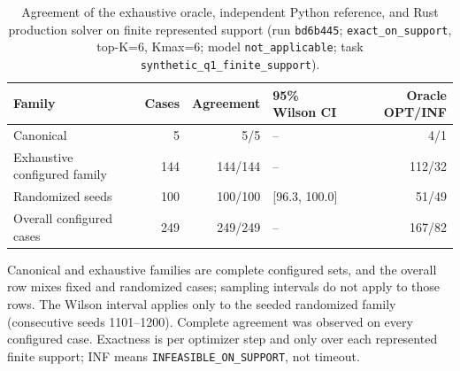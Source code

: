 \begin{table}[t]
\centering
\caption{Agreement of the exhaustive oracle, independent Python reference, and Rust production solver on finite represented support (run \texttt{bd6b445}; \texttt{exact\_on\_support}, top-K=6, Kmax=6; model \texttt{not\_applicable}; task \texttt{synthetic\_q1\_finite\_support}).}
\label{tab:mwpc-correctness-oracle}
\begin{tabular}{p{4.0cm}rrlr}
\toprule
Family & Cases & Agreement & 95\% Wilson CI & Oracle OPT/INF \\
\midrule
Canonical & 5 & 5/5 & -- & 4/1 \\
Exhaustive configured family & 144 & 144/144 & -- & 112/32 \\
Randomized seeds & 100 & 100/100 & [96.3, 100.0] & 51/49 \\
Overall configured cases & 249 & 249/249 & -- & 167/82 \\
\bottomrule
\end{tabular}
\par\footnotesize Canonical and exhaustive families are complete configured sets, and the overall row mixes fixed and randomized cases; sampling intervals do not apply to those rows. The Wilson interval applies only to the seeded randomized family (consecutive seeds 1101--1200). Complete agreement was observed on every configured case. Exactness is per optimizer step and only over each represented finite support; INF means \texttt{INFEASIBLE\_ON\_SUPPORT}, not timeout.
\end{table}
